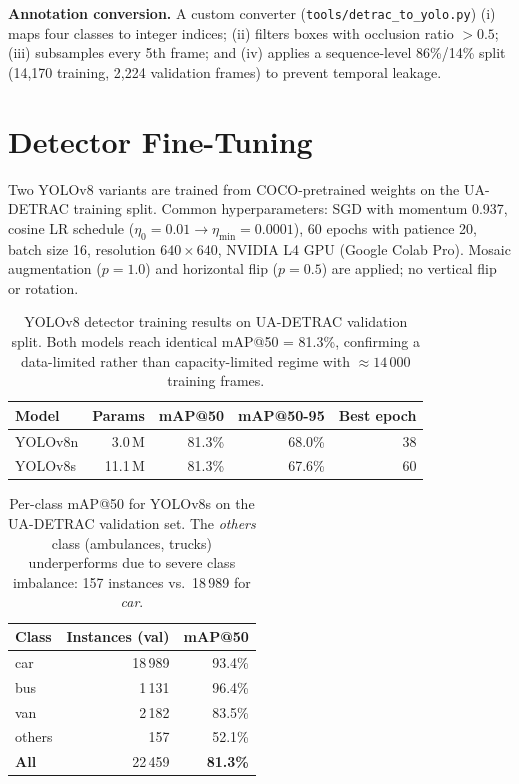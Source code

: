 \documentclass[12pt,a4paper]{report}
\begin{document}
\textbf{Annotation conversion.} A custom converter (\texttt{tools/detrac\_to\_yolo.py})
(i) maps four classes to integer indices; (ii) filters boxes with occlusion ratio $>0.5$;
(iii) subsamples every 5th frame; and (iv) applies a sequence-level 86\%/14\% split
(14,170 training, 2,224 validation frames) to prevent temporal leakage.

\section{Detector Fine-Tuning}
\label{sec:finetuning}

Two YOLOv8 variants are trained from COCO-pretrained weights on the
UA-DETRAC training split. Common hyperparameters: SGD with momentum 0.937,
cosine LR schedule ($\eta_0{=}0.01 \to \eta_{\min}{=}0.0001$), 60 epochs
with patience 20, batch size 16, resolution $640{\times}640$, NVIDIA L4 GPU
(Google Colab Pro). Mosaic augmentation ($p{=}1.0$) and horizontal flip
($p{=}0.5$) are applied; no vertical flip or rotation.

\begin{table}[htbp]
  \centering
  \caption{YOLOv8 detector training results on UA-DETRAC validation split.
           Both models reach identical mAP@50 = 81.3\%, confirming a
           data-limited rather than capacity-limited regime with
           ${\approx}14\,000$ training frames.}
  \label{tab:detector_results}
  \small
  \begin{tabular}{@{}lrrrr@{}}
    \toprule
    \textbf{Model} & \textbf{Params} & \textbf{mAP@50} & \textbf{mAP@50-95} & \textbf{Best epoch} \\
    \midrule
    YOLOv8n & 3.0\,M  & 81.3\% & 68.0\% & 38 \\
    YOLOv8s & 11.1\,M & 81.3\% & 67.6\% & 60 \\
    \bottomrule
  \end{tabular}
\end{table}

\begin{table}[htbp]
  \centering
  \caption{Per-class mAP@50 for YOLOv8s on the UA-DETRAC validation set.
           The \emph{others} class (ambulances, trucks) underperforms due to severe
           class imbalance: 157 instances vs.\ 18\,989 for \emph{car}.}
  \label{tab:perclass_results}
  \small
  \begin{tabular}{@{}lrr@{}}
    \toprule
    \textbf{Class} & \textbf{Instances (val)} & \textbf{mAP@50} \\
    \midrule
    car    & 18\,989 & 93.4\% \\
    bus    &  1\,131 & 96.4\% \\
    van    &  2\,182 & 83.5\% \\
    others &    157  & 52.1\% \\
    \midrule
    \textbf{All} & 22\,459 & \textbf{81.3\%} \\
    \bottomrule
  \end{tabular}
\end{table}
\end{document}
